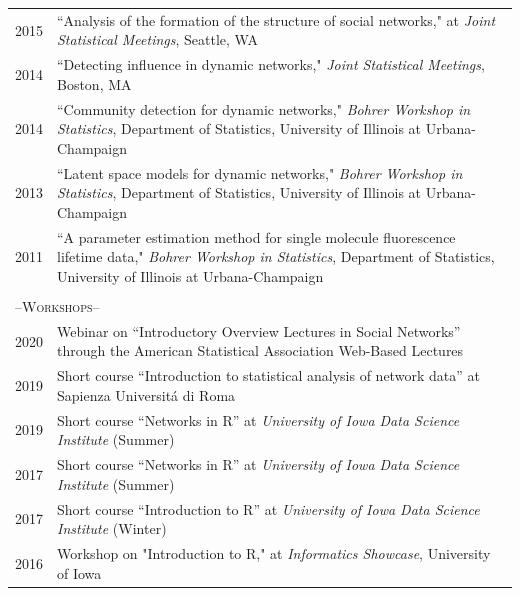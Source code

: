 \documentclass[11pt]{article}
\begin{document}
\begin{longtable}{r|p{15.5cm}}
2015 & ``Analysis of the formation of the structure of social networks," at {\it Joint Statistical Meetings}, Seattle, WA \\
2014 & ``Detecting influence in dynamic networks," {\it Joint Statistical Meetings}, Boston, MA \\
2014 & ``Community detection for dynamic networks," {\it Bohrer Workshop in Statistics}, Department of Statistics, University of Illinois at Urbana-Champaign \\
2013 & ``Latent space models for dynamic networks," {\it Bohrer Workshop in Statistics}, Department of Statistics, University of Illinois at Urbana-Champaign \\
2011 & ``A parameter estimation method for single molecule fluorescence lifetime data," {\it Bohrer Workshop in Statistics}, Department of Statistics, University of Illinois at Urbana-Champaign\\
\multicolumn{2}{l}{}\\
\multicolumn{2}{l}{\large--\textsc{Workshops}--\normalsize}\\
2020 & Webinar on ``Introductory Overview Lectures in Social Networks'' through the American Statistical Association Web-Based Lectures \\
2019 & Short course ``Introduction to statistical analysis of network data'' at Sapienza Universit{\' a} di Roma \\
2019 &Short course ``Networks in R'' at {\it University of Iowa Data Science Institute} (Summer) \\
2017 &Short course ``Networks in R'' at {\it University of Iowa Data Science Institute} (Summer) \\
2017 & Short course ``Introduction to R'' at {\it University of Iowa Data Science Institute} (Winter) \\
2016 & Workshop on "Introduction to R," at {\it Informatics Showcase}, University of Iowa
\end{longtable}
\end{document}
